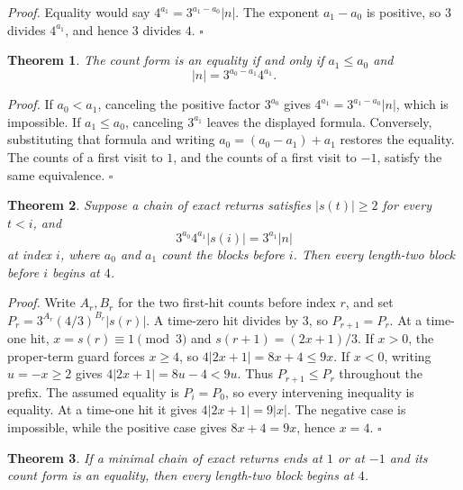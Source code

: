 \documentclass[11pt,letterpaper]{article}
\newtheorem{theorem}{Theorem}
\newenvironment{proof}{\noindent\textit{Proof.}}{\hfill\(\square\)}
\begin{document}
\begin{proof}
Equality would say \(4^{a_{1}}=3^{a_{1}-a_{0}}|n|\). The exponent \(a_{1}-a_{0}\) is positive, so \(3\) divides \(4^{a_{1}}\), and hence \(3\) divides \(4\).
\end{proof}

\begin{theorem}
\label{thm:criterion}
The count form is an equality if and only if \(a_{1}\le a_{0}\) and
\[
|n|=3^{a_{0}-a_{1}}4^{a_{1}}.
\]
\end{theorem}

\begin{proof}
If \(a_{0}<a_{1}\), canceling the positive factor \(3^{a_{0}}\) gives \(4^{a_{1}}=3^{a_{1}-a_{0}}|n|\), which is impossible. If \(a_{1}\le a_{0}\), canceling \(3^{a_{1}}\) leaves the displayed formula. Conversely, substituting that formula and writing \(a_{0}=(a_{0}-a_{1})+a_{1}\) restores the equality. The counts of a first visit to \(1\), and the counts of a first visit to \(-1\), satisfy the same equivalence.
\end{proof}

\begin{theorem}
\label{thm:forcefour}
Suppose a chain of exact returns satisfies \(\lvert s(t)\rvert\ge2\) for every \(t<i\), and
\[
3^{a_{0}}4^{a_{1}}|s(i)|=3^{a_{1}}|n|
\]
at index \(i\), where \(a_{0}\) and \(a_{1}\) count the blocks before \(i\). Then every length-two block before \(i\) begins at \(4\).
\end{theorem}

\begin{proof}
Write \(A_r,B_r\) for the two first-hit counts before index \(r\), and set \(P_r=3^{A_r}(4/3)^{B_r}|s(r)|\). A time-zero hit divides by \(3\), so \(P_{r+1}=P_r\). At a time-one hit, \(x=s(r)\equiv1\pmod3\) and \(s(r+1)=(2x+1)/3\). If \(x>0\), the proper-term guard forces \(x\ge4\), so \(4|2x+1|=8x+4\le9x\). If \(x<0\), writing \(u=-x\ge2\) gives \(4|2x+1|=8u-4<9u\). Thus \(P_{r+1}\le P_r\) throughout the prefix. The assumed equality is \(P_i=P_0\), so every intervening inequality is equality. At a time-one hit it gives \(4|2x+1|=9|x|\). The negative case is impossible, while the positive case gives \(8x+4=9x\), hence \(x=4\).
\end{proof}

\begin{theorem}
\label{thm:hitforcefour}
If a minimal chain of exact returns ends at \(1\) or at \(-1\) and its count form is an equality, then every length-two block begins at \(4\).
\end{theorem}
\end{document}
